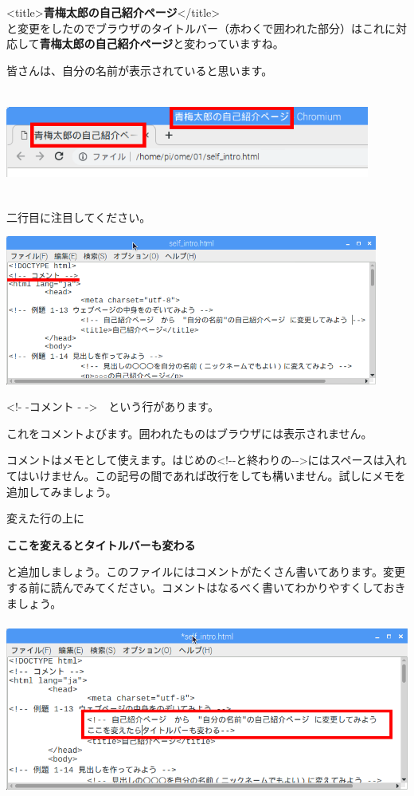 \documentclass[a4paper,12pt]{jarticle}
\begin{document}
{\textless}title{\textgreater}\textbf{青梅太郎の自己紹介ページ}{\textless}/title{\textgreater}\\
と変更をしたのでブラウザのタイトルバー（赤わくで囲われた部分）はこれに対応して\textbf{青梅太郎の自己紹介ページ}と変わっていますね。

皆さんは、自分の名前が表示されていると思います。

\centering
\includegraphics[width=12.006cm,height=3.482cm]{textbook-img152.png}
\flushleft


二行目に注目してください。

\centering
\includegraphics[width=12.273cm,height=4.909cm]{textbook-img151.png}
\flushleft



\bigskip

{\textless}!- -コメント -
-{\textgreater}　という行があります。

これをコメントよびます。囲われたものはブラウザには表示されません。

コメントはメモとして使えます。はじめの{\textless}!-{}-と終わりの{}-{}-{\textgreater}にはスペースは入れてはいけません。この記号の間であれば改行をしても構いません。試しにメモを追加してみましょう。

変えた行の上に

\textbf{ここを変えるとタイトルバーも変わる
}

と追加しましょう。このファイルにはコメントがたくさん書いてあります。変更する前に読んでみてください。コメントはなるべく書いてわかりやすくしておきましょう。


\centering
\includegraphics[width=14.42cm,height=5.768cm]{textbook-img150.png}
\end{document}
